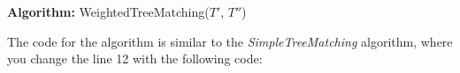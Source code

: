 \documentclass[varwidth=550pt]{standalone}
\begin{document}
\begin{LARGE}

{\bf Algorithm:} WeightedTreeMatching($T'$, $T''$)

The code for the algorithm is similar to the {\it SimpleTreeMatching} algorithm, where you change the line 12 with the following code:\\

\begin{algorithm}[H]
	\SetEndCharOfAlgoLine{}
	\SetAlgoNoLine
	
\end{algorithm}

\end{LARGE}
\end{document}
